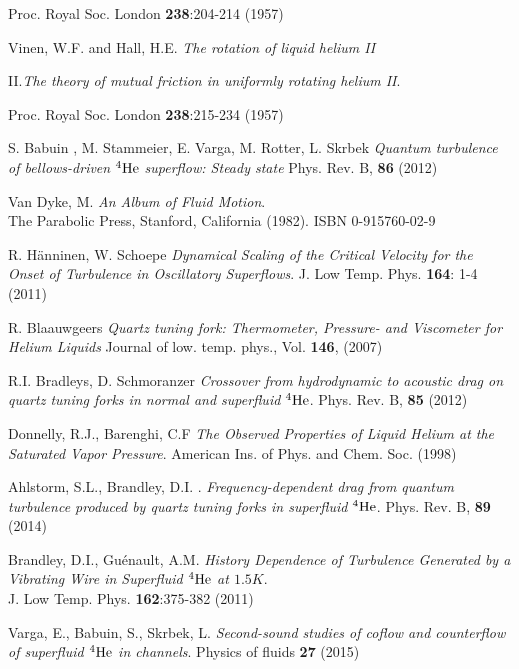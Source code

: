 \begin{thebibliography}{99}
Proc. Royal Soc. London \textbf{238}:204-214 (1957)

{\sc Vinen, W.F.} and {\sc Hall, H.E.}
\emph{The rotation of liquid helium II}

II.\hspace{2mm}\emph{The theory of mutual friction in uniformly rotating helium II}.

Proc. Royal Soc. London \textbf{238}:215-234 (1957)

{\sc S. Babuin , M. Stammeier, E. Varga, M. Rotter, L. Skrbek  }
\emph{Quantum turbulence of bellows-driven ${}^4\mathrm{He}$ superflow: Steady state} Phys. Rev. B, \textbf{86} (2012)

{\sc Van Dyke, M.}
\emph{An Album of Fluid Motion}.\\
The Parabolic Press, Stanford, California (1982). ISBN 0-915760-02-9

{\sc R. Hänninen, W. Schoepe}
\emph{Dynamical Scaling of the Critical Velocity for the Onset of Turbulence in Oscillatory Superflows}.
J. Low Temp. Phys. \textbf{164}: 1-4 (2011)

{\sc R. Blaauwgeers} 
\emph{Quartz tuning fork: Thermometer, Pressure- and Viscometer for Helium Liquids} Journal of low. temp. phys., Vol. \textbf{146}, (2007)

{\sc R.I. Bradleys, D. Schmoranzer} 
\emph{Crossover from hydrodynamic to acoustic drag on quartz tuning forks in normal and superfluid $ {}^4\mathrm{He} $}. Phys. Rev. B, \textbf{85} (2012)

{\sc Donnelly, R.J., Barenghi, C.F}
\emph{The Observed Properties of Liquid Helium at the Saturated Vapor Pressure}. American Ins. of Phys. and Chem. Soc. (1998)

{\sc Ahlstorm, S.L., Brandley, D.I.} .
\emph{Frequency-dependent drag from quantum turbulence produced by quartz tuning forks in superfluid $ {}^4\mathrm{He} $}.
Phys. Rev. B, \textbf{89} (2014)

{\sc Brandley, D.I., Guénault, A.M.} 
\emph{History Dependence of Turbulence Generated by a Vibrating Wire in Superfluid $ {}^4\mathrm{He} $ at $ 1.5\unit{K} $}.\\
J. Low Temp. Phys. \textbf{162}:375-382 (2011)

{\sc Varga, E., Babuin, S., Skrbek, L.}
\emph{Second-sound studies of coflow and counterflow of superfluid $ {}^4\mathrm{He} $ in channels}.
Physics of fluids \textbf{27} (2015)


\end{thebibliography}
